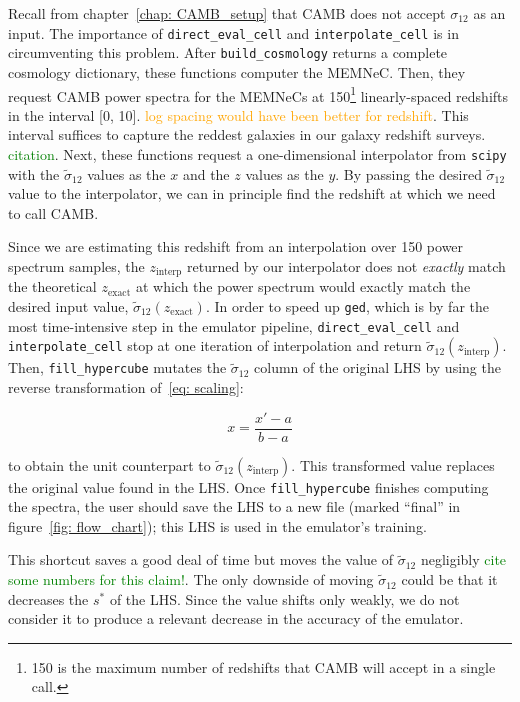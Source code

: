 
Recall from chapter~\ref{chap: CAMB_setup} that CAMB does not accept
$\sigma_{12}$ as an input. The importance of \verb|direct_eval_cell| and 
\verb|interpolate_cell| is in circumventing this problem.
After \verb|build_cosmology| returns a complete cosmology dictionary, these
functions computer the MEMNeC. Then, they request CAMB power spectra for the
MEMNeCs at 150\footnote{150 is the maximum number of redshifts that CAMB will
accept in a single call.} linearly-spaced redshifts in the
interval [0, 10]. \textcolor{orange}{log spacing would have been better for
redshift}. This interval suffices to capture the reddest galaxies
in our galaxy redshift surveys. \textcolor{green}{citation}. Next, these
functions request a one-dimensional interpolator from \texttt{scipy} with
the $\tilde{\sigma}_{12}$ values as the $x$ and the $z$ values as the $y$.
By passing the desired $\tilde{\sigma}_{12}$ value to the interpolator, we
can in principle find the redshift at which we need to call CAMB.


Since we are estimating this redshift from an interpolation over 150 power
spectrum samples, the $z_\text{interp}$ returned by our interpolator does not
\textit{exactly} match the theoretical $z_\text{exact}$ at which the
power spectrum would exactly match the desired input value,
$\tilde{\sigma}_{12}(z_\text{exact})$. In order to speed up \texttt{ged},
which is by far the most time-intensive step in the emulator pipeline,
\verb|direct_eval_cell| and \verb|interpolate_cell| stop at one iteration of 
interpolation and return $\tilde{\sigma}_{12}(z_\text{interp})$. Then,
\verb|fill_hypercube| mutates the $\tilde{\sigma}_{12}$ column of the original 
LHS by using the reverse transformation of~\ref{eq: scaling}:

\begin{equation}
x = \frac{x' - a}{b - a}
\end{equation}

to obtain the unit counterpart to $\tilde{\sigma}_{12}(z_\text{interp})$.
This transformed value replaces the original value found in the LHS.
Once \verb|fill_hypercube| finishes computing the spectra, the user
should save the LHS to a new file (marked ``final'' in
figure~\ref{fig: flow_chart}); this LHS is used in the emulator's training.

This shortcut saves a good deal of time but moves the value of
$\tilde{\sigma}_{12}$ negligibly
\textcolor{green}{cite some numbers for this claim!}.
The only downside of moving $\tilde{\sigma}_{12}$ could be that it
decreases the $s^*$ of the LHS. Since the value shifts only weakly, we do not
consider it to produce a relevant decrease in the accuracy of the emulator.

